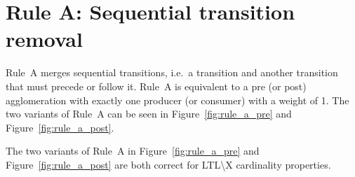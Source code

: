 \section*{Rule A: Sequential transition removal}\label{sec:rule_a}
Rule~A merges sequential transitions, i.e.\ a transition and another transition that must precede or follow it.
Rule~A is equivalent to a pre (or post) agglomeration with exactly one producer (or consumer) with a weight of 1.
The two variants of Rule~A can be seen in Figure~\ref{fig:rule_a_pre} and Figure~\ref{fig:rule_a_post}.

\begin{theorem}\label{theorem:rule_a}
    The two variants of Rule~A in Figure~\ref{fig:rule_a_pre} and Figure~\ref{fig:rule_a_post} are both correct for LTL\textbackslash X cardinality properties.
\end{theorem}

